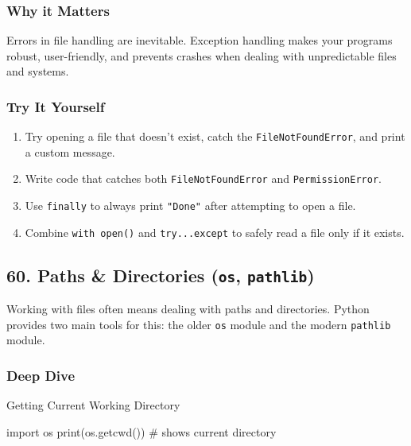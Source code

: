 \documentclass[
  letterpaper,
  DIV=11,
  numbers=noendperiod]{scrreprt}
\newenvironment{Shaded}{\begin{snugshade}}{\end{snugshade}}
\newcommand{\BuiltInTok}[1]{\textcolor[rgb]{0.00,0.23,0.31}{#1}}
\newcommand{\CommentTok}[1]{\textcolor[rgb]{0.37,0.37,0.37}{#1}}
\newcommand{\ImportTok}[1]{\textcolor[rgb]{0.00,0.46,0.62}{#1}}
\newcommand{\NormalTok}[1]{\textcolor[rgb]{0.00,0.23,0.31}{#1}}
\providecommand{\tightlist}{%
  \setlength{\itemsep}{0pt}\setlength{\parskip}{0pt}}
\begin{document}
\subsubsection{Why it Matters}\label{why-it-matters-58}

Errors in file handling are inevitable. Exception handling makes your
programs robust, user-friendly, and prevents crashes when dealing with
unpredictable files and systems.

\subsubsection{Try It Yourself}\label{try-it-yourself-58}

\begin{enumerate}
\def\labelenumi{\arabic{enumi}.}
\tightlist
\item
  Try opening a file that doesn't exist, catch the
  \texttt{FileNotFoundError}, and print a custom message.
\item
  Write code that catches both \texttt{FileNotFoundError} and
  \texttt{PermissionError}.
\item
  Use \texttt{finally} to always print \texttt{"Done"} after attempting
  to open a file.
\item
  Combine \texttt{with\ open()} and \texttt{try...except} to safely read
  a file only if it exists.
\end{enumerate}

\subsection{\texorpdfstring{60. Paths \& Directories (\texttt{os},
\texttt{pathlib})}{60. Paths \& Directories (os, pathlib)}}\label{paths-directories-os-pathlib}

Working with files often means dealing with paths and directories.
Python provides two main tools for this: the older \texttt{os} module
and the modern \texttt{pathlib} module.

\subsubsection{Deep Dive}\label{deep-dive-59}

Getting Current Working Directory

\begin{Shaded}
\begin{Highlighting}[]
\ImportTok{import}\NormalTok{ os}
\BuiltInTok{print}\NormalTok{(os.getcwd())   }\CommentTok{\# shows current directory}
\end{Highlighting}
\end{Shaded}
\end{document}
